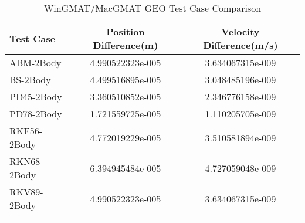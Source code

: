 \begin{table}[htbp!]
\centering
\caption{ WinGMAT/MacGMAT GEO Test Case Comparison}
      \begin{tabular}{lcc}
      \hline\hline
          Test Case & Position Difference(m) & Velocity Difference(m/s) \\
         \hline
         ABM-2Body & 4.990522323e-005 & 3.634067315e-009 \\
         BS-2Body & 4.499516895e-005 & 3.048485196e-009 \\
         PD45-2Body & 3.360510852e-005 & 2.346776158e-009 \\
         PD78-2Body & 1.721559725e-005 & 1.110205705e-009 \\
         RKF56-2Body & 4.772019229e-005 & 3.510581894e-009 \\
         RKN68-2Body & 6.394945484e-005 & 4.727059048e-009 \\
         RKV89-2Body & 4.990522323e-005 & 3.634067315e-009 \\
      \hline\hline
      \label{Table: GEO WinGMAT-MacGMAT Table} 
\end{tabular}
\end{table}
